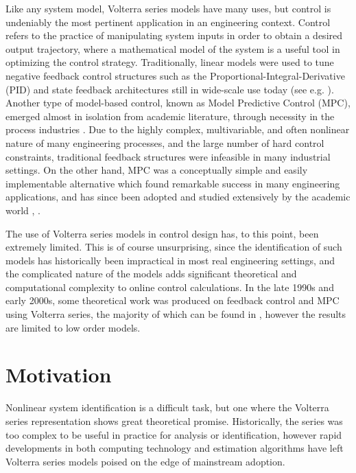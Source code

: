 Like any system model, Volterra series models have many uses, but control is undeniably the most pertinent application in an engineering context. Control refers to the practice of manipulating system inputs in order to obtain a desired output trajectory, where a mathematical model of the system is a useful tool in optimizing the control strategy. Traditionally, linear models were used to tune negative feedback control structures such as the Proportional-Integral-Derivative (PID) and state feedback architectures still in wide-scale use today (see e.g. \cite{Goodwin2001}). Another type of model-based control, known as Model Predictive Control (MPC), emerged almost in isolation from academic literature, through necessity in the process industries \cite{Mayne2014}. Due to the highly complex, multivariable, and often nonlinear nature of many engineering processes, and the large number of hard control constraints, traditional feedback structures were infeasible in many industrial settings. On the other hand, MPC was a conceptually simple and easily implementable alternative which found remarkable success in many engineering applications, and has since been adopted and studied extensively by the academic world \cite{Maciejowski2002}, \cite{Rawlings2009}.

The use of Volterra series models in control design has, to this point, been extremely limited. This is of course unsurprising, since the identification of such models has historically been impractical in most real engineering settings, and the complicated nature of the models adds significant theoretical and computational complexity to online control calculations. In the late 1990s and early 2000s, some theoretical work was produced on feedback control and MPC using Volterra series, the majority of which can be found in \cite{Doyle2002}, however the results are limited to low order models.

\section{Motivation}
\label{sec:intro-motivation}

Nonlinear system identification is a difficult task, but one where the Volterra series representation shows great theoretical promise. Historically, the series was too complex to be useful in practice for analysis or identification, however rapid developments in both computing technology and estimation algorithms have left Volterra series models poised on the edge of mainstream adoption.

